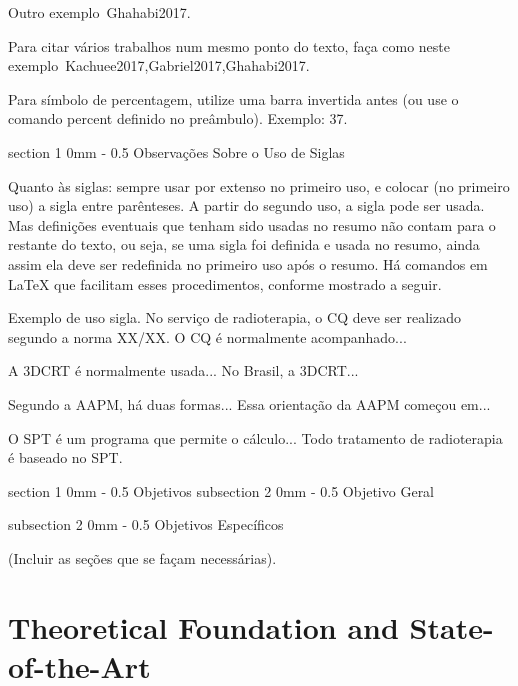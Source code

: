 \documentclass[a4paper, 12pt]{ppgeb}
\makeatletter
\renewcommand{\section}{\@startsection
{section}
{1}
{0mm}
{-\baselineskip}
{0.5\baselineskip}
{\large\bfseries\scshape}}
\renewcommand{\subsection}{\@startsection
{subsection}
{2}
{0mm}
{-\baselineskip}
{0.5\baselineskip}
{\bf\sffamily}}
\newcommand{\percentagesignscale}{0.8}
\newcommand{\percent}{\scalebox{\percentagesignscale}{~\%}}
\makeatother
\begin{document}
Outro exemplo~\cite{mainreferences}{Ghahabi2017}.

Para citar vários trabalhos num mesmo ponto do texto, faça como neste exemplo~\cite{mainreferences}{Kachuee2017,Gabriel2017,Ghahabi2017}.

Para símbolo de percentagem, utilize uma barra invertida antes (ou use o comando percent definido no preâmbulo). Exemplo: 37\percent.

\section{Observações Sobre o Uso de Siglas}

Quanto às siglas: sempre usar por extenso no primeiro uso, e colocar (no primeiro uso) a sigla entre parênteses. A partir do segundo uso, a sigla pode ser usada. Mas definições eventuais que tenham sido usadas no resumo não contam para o restante do texto, ou seja, se uma sigla foi definida e usada no resumo, ainda assim ela deve ser redefinida no primeiro uso após o resumo. Há comandos em LaTeX que facilitam esses procedimentos, conforme mostrado a seguir.

Exemplo de uso sigla. No serviço de radioterapia, o \ac{CQ} deve ser realizado segundo a norma XX/XX. O \ac{CQ} é normalmente acompanhado... 

A \ac{3DCRT} é normalmente usada... No Brasil, a \ac{3DCRT}...

Segundo a \ac{AAPM}, há duas formas... Essa orientação da \ac{AAPM} começou em...

O \ac{SPT} é um programa que permite o cálculo... Todo tratamento de radioterapia é baseado no \ac{SPT}.

\section{Objetivos}
\subsection{Objetivo Geral}

\subsection{Objetivos Específicos}

(Incluir as seções que se façam necessárias).

\chapter{Theoretical Foundation and State-of-the-Art}\label{chap:FT}
\end{document}

